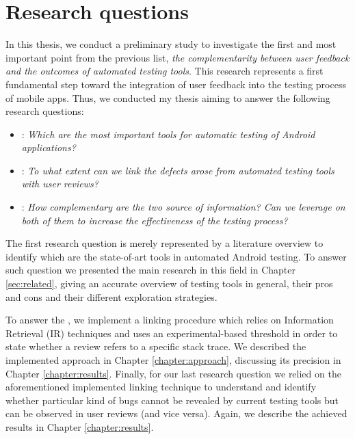 \section{Research questions}
\label{section:rqs}
In this thesis, we conduct a preliminary study to investigate the first and most important point from the previous list, \ie \textit{the complementarity between user feedback and the outcomes of automated testing tools}. This research represents a first fundamental step toward the integration of user feedback into the testing process of mobile apps. Thus, we conducted my thesis aiming to answer the following research questions:

\begin{itemize}
	\item {}: \textit{Which are the most important tools for automatic testing of Android applications?} %
	\item {}: \textit{To what extent can we link the defects arose from automated testing tools with user reviews?}  
	\item {}: \textit{How complementary are the two source of information? Can we leverage on both of them to increase the effectiveness of the testing process?}
\end{itemize}
The first research question is merely represented by a literature overview to identify which are the state-of-art tools in automated Android testing. To answer such question we presented the main research in this field in Chapter \ref{sec:related}, giving an accurate overview of testing tools in general, their pros and cons and their different exploration strategies. 

To answer the , we implement a linking procedure which relies on Information Retrieval (IR) techniques and uses an experimental-based threshold in order to state whether a review refers to a specific stack trace. We described the implemented approach in Chapter \ref{chapter:approach}, discussing its precision in Chapter \ref{chapter:results}.
Finally, for our last research question we relied on the aforementioned implemented linking technique to understand and identify whether particular kind of bugs cannot be revealed by current testing tools but can be observed in user reviews (and vice versa). Again, we describe the achieved results in Chapter \ref{chapter:results}.
